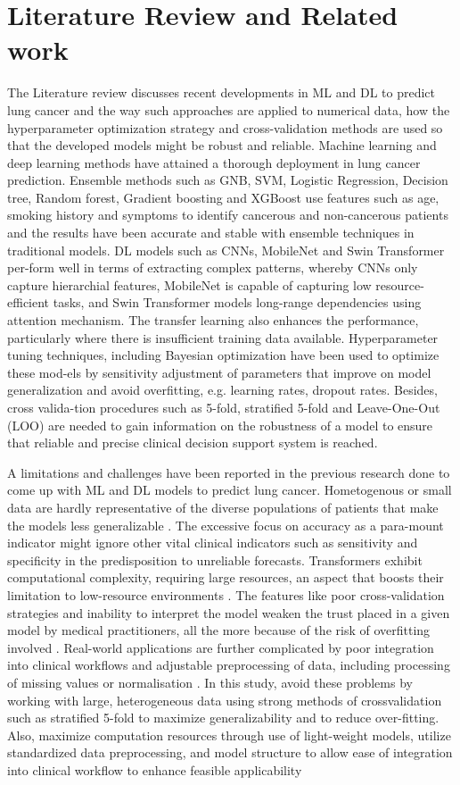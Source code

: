 \documentclass[runningheads]{llncs}
\begin{document}
\section{Literature Review and Related work}
The Literature review discusses recent developments in ML and DL to predict lung cancer and the way such approaches are applied to numerical data, how the hyperparameter optimization strategy and cross-validation methods are used so that the developed models might be robust and reliable. Machine learning and deep learning methods have attained a thorough deployment in lung cancer prediction. Ensemble methods such as GNB, SVM, Logistic Regression, Decision tree, Random forest, Gradient boosting and XGBoost use features such as age, smoking history and symptoms to identify cancerous and non-cancerous patients and the results have been accurate and stable with ensemble techniques in 
traditional models. DL models such as CNNs, MobileNet and Swin Transformer per-form well in terms of extracting complex patterns, whereby CNNs only capture hierarchial features, MobileNet is capable of capturing low resource-efficient tasks, and Swin Transformer models long-range dependencies using attention mechanism. The transfer learning also enhances the performance, particularly where there is insufficient training data available. Hyperparameter tuning techniques, including Bayesian optimization have been used to optimize these mod-els by sensitivity adjustment of parameters that improve on model generalization and avoid overfitting, e.g. learning rates, dropout rates. Besides, cross valida-tion procedures such as 5-fold, stratified 5-fold and Leave-One-Out (LOO) are needed to gain information on the robustness of a model to ensure that reliable and precise clinical decision support system is reached. 

A limitations and challenges have been reported in the previous research done to come up with ML and DL models to predict lung cancer. Hometogenous or small data are hardly representative of the diverse populations of patients that make the models less generalizable \cite{kadir2018}. The excessive focus on accuracy as a para-mount indicator might ignore other vital clinical indicators such as sensitivity and specificity in the predisposition to unreliable forecasts. Transformers exhibit computational complexity, requiring large resources, an aspect that boosts their limitation to low-resource environments \cite{tuncal2020}. The features like poor cross-validation strategies and inability to interpret the model weaken the trust placed in a given model by medical practitioners, all the more because of the risk of overfitting involved \cite{chen2022}. Real-world applications are further complicated by poor integration into clinical workflows and adjustable preprocessing of data, including processing of missing values or normalisation  \cite{sweet2024}. In this study, avoid these problems by working with large, heterogeneous data using strong methods of crossvalidation such as stratified 5-fold to maximize generalizability and to reduce over-fitting. Also, maximize computation resources through use of light-weight models, utilize standardized data preprocessing, and model structure to allow ease of integration into clinical workflow to enhance feasible applicability 
\end{document}
